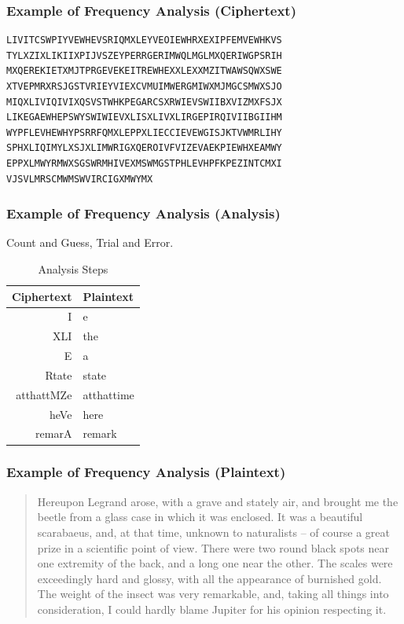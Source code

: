 \begin{frame}[fragile]\frametitle{Example of Frequency Analysis (Ciphertext)}
\begin{verbatim}
LIVITCSWPIYVEWHEVSRIQMXLEYVEOIEWHRXEXIPFEMVEWHKVS
TYLXZIXLIKIIXPIJVSZEYPERRGERIMWQLMGLMXQERIWGPSRIH
MXQEREKIETXMJTPRGEVEKEITREWHEXXLEXXMZITWAWSQWXSWE
XTVEPMRXRSJGSTVRIEYVIEXCVMUIMWERGMIWXMJMGCSMWXSJO
MIQXLIVIQIVIXQSVSTWHKPEGARCSXRWIEVSWIIBXVIZMXFSJX
LIKEGAEWHEPSWYSWIWIEVXLISXLIVXLIRGEPIRQIVIIBGIIHM
WYPFLEVHEWHYPSRRFQMXLEPPXLIECCIEVEWGISJKTVWMRLIHY
SPHXLIQIMYLXSJXLIMWRIGXQEROIVFVIZEVAEKPIEWHXEAMWY
EPPXLMWYRMWXSGSWRMHIVEXMSWMGSTPHLEVHPFKPEZINTCMXI
VJSVLMRSCMWMSWVIRCIGXMWYMX
\end{verbatim}
\end{frame}
\begin{frame}[fragile]\frametitle{Example of Frequency Analysis (Analysis)}
Count and Guess, Trial and Error.
\begin{table}
\begin{center}
\caption{Analysis Steps}
\begin{tabular}{|r|l|} \hline
Ciphertext & Plaintext \\ \hline
\alert{I}   & \alert{e} \\
\alert{XLI} & \alert{the} \\
\alert{E} & \alert{a} \\
\alert{R}tate & \alert{s}tate \\
atthatt\alert{MZ}e & atthatt\alert{im}e \\
he\alert{V}e & he\alert{r}e \\
remar\alert{A} & remar\alert{k} \\ \hline
\end{tabular}
\end{center}
\end{table}
\end{frame}
\begin{frame}[fragile]\frametitle{Example of Frequency Analysis (Plaintext)}
\begin{quote}
Hereupon Legrand arose, with a grave and stately air, and brought me the beetle
from a glass case in which it was enclosed. It was a beautiful scarabaeus, and, at
that time, unknown to naturalists -- of course a great prize in a scientific point
of view. There were two round black spots near one extremity of the back, and a
long one near the other. The scales were exceedingly hard and glossy, with all the
appearance of burnished gold. The weight of the insect was very remarkable, and,
taking all things into consideration, I could hardly blame Jupiter for his opinion
respecting it.

\end{quote}
\end{frame}

